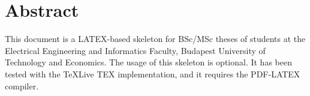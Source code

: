 \chapter*{Abstract}

This document is a LATEX-based skeleton for BSc/MSc theses of students at the Electrical Engineering and Informatics Faculty, Budapest University of Technology and Economics. The usage of this skeleton is optional. It has been tested with the TeXLive TEX implementation, and it requires the PDF-LATEX compiler.
